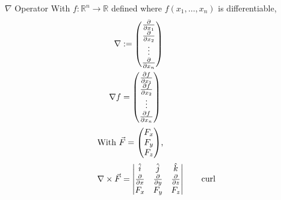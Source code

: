 \documentclass[8pt]{extarticle}
\newcommand{\R}{\mathbb{R}}
\begin{document}
  \begin{problem}{$\nabla$ Operator}
    With $f: \R^n \rightarrow \R$ defined where $f(x_1,\dots,x_n)$ is differentiable,
    \begin{align*}
      \nabla &:= \begin{pmatrix}\frac{\partial}{\partial x_1}\\\frac{\partial}{\partial x_2}\\\vdots\\\frac{\partial}{\partial x_n}\end{pmatrix}\\
      \nabla f &= \begin{pmatrix}\frac{\partial f}{\partial x_1}\\\frac{\partial f}{\partial x_2}\\\vdots\\\frac{\partial f}{\partial x_n}\end{pmatrix}\\
      \shortintertext{With $\vec{F} = \begin{pmatrix}F_x\\F_y\\F_z\end{pmatrix}$,}
      \nabla \times \vec{F} &= \begin{vmatrix}\hat{i} & \hat{j} & \hat{k} \\ \frac{\partial }{\partial x} & \frac{\partial}{\partial y} & \frac{\partial}{\partial z} \\ F_x & F_y & F_z\end{vmatrix} \tag*{curl}
    \end{align*}
  \end{problem}
\end{document}
